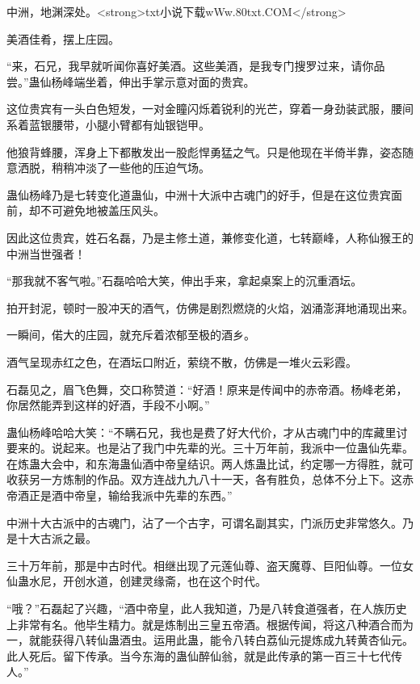 
\begin{this_body}

中洲，地渊深处。<strong>txt小说下载wWw.80txt.COM</strong>

美酒佳肴，摆上庄园。

“来，石兄，我早就听闻你喜好美酒。这些美酒，是我专门搜罗过来，请你品尝。”蛊仙杨峰端坐着，伸出手掌示意对面的贵宾。

这位贵宾有一头白色短发，一对金瞳闪烁着锐利的光芒，穿着一身劲装武服，腰间系着蓝银腰带，小腿小臂都有灿银铠甲。

他狼背蜂腰，浑身上下都散发出一股彪悍勇猛之气。只是他现在半倚半靠，姿态随意洒脱，稍稍冲淡了一些他的压迫气场。

蛊仙杨峰乃是七转变化道蛊仙，中洲十大派中古魂门的好手，但是在这位贵宾面前，却不可避免地被盖压风头。

因此这位贵宾，姓石名磊，乃是主修土道，兼修变化道，七转巅峰，人称仙猴王的中洲当世强者！

“那我就不客气啦。”石磊哈哈大笑，伸出手来，拿起桌案上的沉重酒坛。

拍开封泥，顿时一股冲天的酒气，仿佛是剧烈燃烧的火焰，汹涌澎湃地涌现出来。

一瞬间，偌大的庄园，就充斥着浓郁至极的酒乡。

酒气呈现赤红之色，在酒坛口附近，萦绕不散，仿佛是一堆火云彩霞。

石磊见之，眉飞色舞，交口称赞道：“好酒！原来是传闻中的赤帝酒。杨峰老弟，你居然能弄到这样的好酒，手段不小啊。”

蛊仙杨峰哈哈大笑：“不瞒石兄，我也是费了好大代价，才从古魂门中的库藏里讨要来的。说起来。也是沾了我门中先辈的光。三十万年前，我派中一位蛊仙先辈。在炼蛊大会中，和东海蛊仙酒中帝皇结识。两人炼蛊比试，约定哪一方得胜，就可收获另一方炼制的作品。双方连战九九八十一天，各有胜负，总体不分上下。这赤帝酒正是酒中帝皇，输给我派中先辈的东西。”

中洲十大古派中的古魂门，沾了一个古字，可谓名副其实，门派历史非常悠久。乃是十大古派之最。

三十万年前，那是中古时代。相继出现了元莲仙尊、盗天魔尊、巨阳仙尊。一位女仙蛊水尼，开创水道，创建灵缘斋，也在这个时代。

“哦？”石磊起了兴趣，“酒中帝皇，此人我知道，乃是八转食道强者，在人族历史上非常有名。他毕生精力。就是炼制出三皇五帝酒。根据传闻，将这八种酒合而为一，就能获得八转仙蛊酒虫。运用此蛊，能令八转白荔仙元提炼成九转黄杏仙元。此人死后。留下传承。当今东海的蛊仙醉仙翁，就是此传承的第一百三十七代传人。”


\end{this_body}
